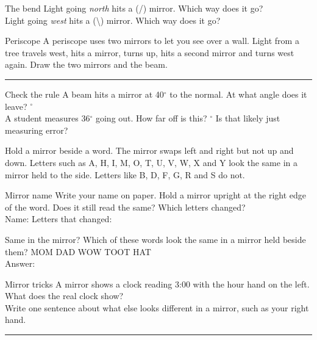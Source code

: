 \begin{puzzle}{The bend}
Light going \emph{north} hits a (/) mirror. Which way does it go? \wline[2cm]\\
Light going \emph{west} hits a (\textbackslash) mirror. Which way does it go? \wline[2cm]
\end{puzzle}

\begin{puzzle}{Periscope}
A periscope uses two mirrors to let you see over a wall. Light from a tree travels west, hits a mirror, turns up, hits a second mirror and turns west again. Draw the two mirrors and the beam.\\
\rule{\linewidth}{0.5pt}
\end{puzzle}

\begin{puzzle}{Check the rule}
A beam hits a mirror at 40$^\circ$ to the normal. At what angle does it leave? \wline[1.4cm]$^\circ$\\
A student measures 36$^\circ$ going out. How far off is this? \wline[1.4cm]$^\circ$ Is that likely just measuring error? \wline[2cm]
\end{puzzle}
\clearpage

Hold a mirror beside a word. The mirror swaps left and right but not up and down. Letters such as A, H, I, M, O, T, U, V, W, X and Y look the same in a mirror held to the side. Letters like B, D, F, G, R and S do not.

\begin{tryit}{Mirror name}
Write your name on paper. Hold a mirror upright at the right edge of the word. Does it still read the same? Which letters changed?\\
Name: \wline[3cm] \quad Letters that changed: \wline[4cm]
\end{tryit}

\begin{puzzle}{Same in the mirror?}
Which of these words look the same in a mirror held beside them? MOM \quad DAD \quad WOW \quad TOOT \quad HAT\\
Answer: \wline[5cm]
\end{puzzle}

\begin{puzzle}{Mirror tricks}
A mirror shows a clock reading 3:00 with the hour hand on the left. What does the real clock show? \wline[2cm]\\
Write one sentence about what else looks different in a mirror, such as your right hand. \\
\rule{\linewidth}{0.5pt}
\end{puzzle}

